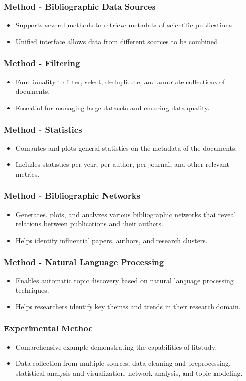 \documentclass{beamer}
\begin{document}
\begin{frame}
\frametitle{Method - Bibliographic Data Sources}
\begin{itemize}
\item Supports several methods to retrieve metadata of scientific publications.
\item Unified interface allows data from different sources to be combined.
\end{itemize}
\end{frame}
\begin{frame}
\frametitle{Method - Filtering}
\begin{itemize}
\item Functionality to filter, select, deduplicate, and annotate collections of documents.
\item Essential for managing large datasets and ensuring data quality.
\end{itemize}
\end{frame}
\begin{frame}
\frametitle{Method - Statistics}
\begin{itemize}
\item Computes and plots general statistics on the metadata of the documents.
\item Includes statistics per year, per author, per journal, and other relevant metrics.
\end{itemize}
\end{frame}
\begin{frame}
\frametitle{Method - Bibliographic Networks}
\begin{itemize}
\item Generates, plots, and analyzes various bibliographic networks that reveal relations between publications and their authors.
\item Helps identify influential papers, authors, and research clusters.
\end{itemize}
\end{frame}
\begin{frame}
\frametitle{Method - Natural Language Processing}
\begin{itemize}
\item Enables automatic topic discovery based on natural language processing techniques.
\item Helps researchers identify key themes and trends in their research domain.
\end{itemize}
\end{frame}
\begin{frame}
\frametitle{Experimental Method}
\begin{itemize}
\item Comprehensive example demonstrating the capabilities of litstudy.
\item Data collection from multiple sources, data cleaning and preprocessing, statistical analysis and visualization, network analysis, and topic modeling.
\end{itemize}
\end{frame}
\end{document}
